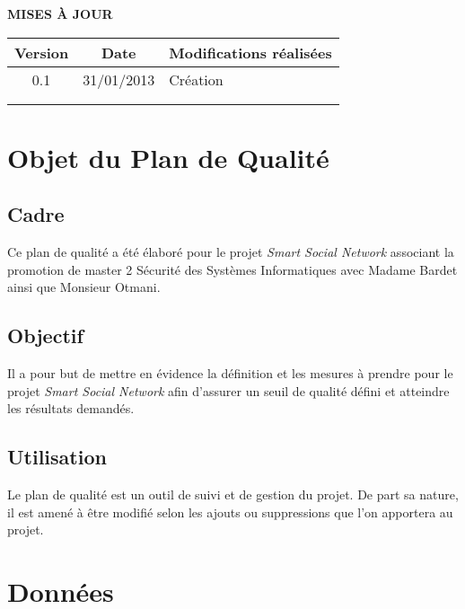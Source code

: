 \documentclass[a4paper,11pt,french]{article}
\begin{document}
\makeFirstPage
\clearpage

\vspace*{1cm}
\begin{center}
\textbf{\huge{MISES À JOUR}}\\
\vspace*{3cm}
	\begin{tabularx}{16cm}{|c|c|X|}
	\hline
	\bfseries{Version} & \bfseries{Date} & \bfseries{Modifications réalisées}\\
	\hline
	0.1 & 31/01/2013 & Création\\
	\hline
	&&\\
	\hline
	&&\\
	\hline
	\end{tabularx}
\end{center}

\clearpage
\tableofcontents
\clearpage

\renewcommand\labelitemi{\textbullet} %
\renewcommand\labelitemii{$\circ$} %
\section{Objet du Plan de Qualité}
\subsection{Cadre}
	Ce plan de qualité a été élaboré pour le projet \emph{Smart Social
Network} associant la promotion de master 2 Sécurité des Systèmes
Informatiques avec Madame Bardet ainsi que Monsieur Otmani.

\subsection{Objectif}
	Il a pour but de mettre en évidence la définition et les mesures à
prendre pour le projet \emph{Smart Social Network} afin d'assurer un seuil de
qualité défini et atteindre les résultats demandés.

\subsection{Utilisation}
	Le plan de qualité est un outil de suivi et de gestion du projet.
De part sa nature, il est amené à être modifié selon les ajouts ou 
suppressions que l'on apportera au projet.

\section{Données}
\end{document}
